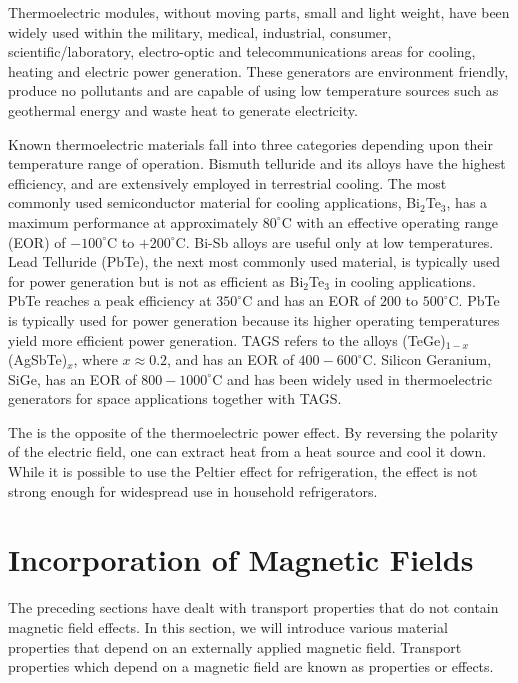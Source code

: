 Thermoelectric modules, without moving parts, small and light weight, have been widely used within the military, medical, industrial, consumer, scientific/laboratory, electro-optic and telecommunications areas for cooling, heating and electric power generation. These generators are environment friendly, produce no pollutants and are capable of using low temperature sources such as  geothermal energy and waste heat to generate electricity. 

Known thermoelectric materials fall into three categories depending upon their temperature range of operation. Bismuth telluride and its alloys have the highest efficiency, and are extensively employed in terrestrial cooling. The most commonly used semiconductor material for cooling applications, Bi$_2$Te$_3$, has a maximum performance at approximately $80^{\circ}$C with an effective operating range (EOR) of $-100^{\circ}$C to $+200^{\circ}$C. Bi-Sb alloys are useful only at low temperatures. Lead Telluride (PbTe), the next most commonly used material, is typically used for power generation but is not as efficient as Bi$_2$Te$_3$ in cooling applications. PbTe reaches a peak efficiency at $350^{\circ}$C and has an EOR of $200$ to $500^{\circ}$C. PbTe is typically used for power generation because its higher operating temperatures yield more efficient power generation. TAGS refers to the alloys (TeGe)$_{1-x}$(AgSbTe)$_x$, where $x \approx 0.2$, and has an EOR of $400-600^{\circ}$C. Silicon Geranium, SiGe, has an EOR of $800-1000^{\circ}$C and has been widely used in thermoelectric generators for space applications together with TAGS. 

The  is the opposite of the thermoelectric power effect.  By reversing the polarity of the electric field, one can extract heat from a heat source and cool it down.  While it is possible to use the Peltier effect for refrigeration, the effect is not strong enough for widespread use in household refrigerators.


\section{Incorporation of Magnetic Fields}\label{\chabbr:sec:galvano}

The preceding sections have dealt with transport properties that do not contain magnetic field effects.  In this section, we will introduce various material properties that depend on an externally applied  magnetic field.  Transport properties which depend on a magnetic field are known as  properties or effects.


